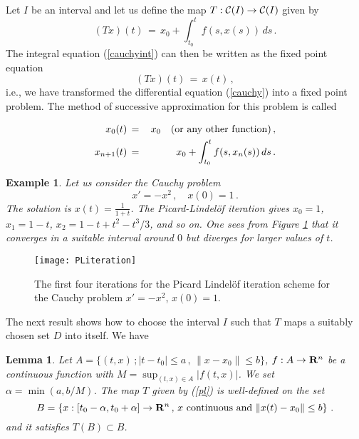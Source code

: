 \documentclass[12pt]{report}
\newcommand{\calC}{{\cal C}}
\newcommand{\bR}{{\bf R}}
\newtheorem{lemma}[theorem]{Lemma}
\newtheorem{example}[theorem]{Example}
\newcommand{\nn}{\nonumber}
\def\eqref#1{(\ref{#1})}
\def\to{\rightarrow}
\begin{document}
Let $I$ be an interval and let us define the map $T : \calC( I) \to \calC(I)$ given by  
\begin{equation}\label{pl}
(Tx)(t) \,=\, x_0 + \int_{t_0}^t f(s, x(s)) \, ds\,.
\end{equation} 
The integral equation \eqref{cauchyint} can then be written as the fixed point equation
\begin{equation} \label{pl2}
(Tx)(t)\,=\, x(t) \,,
\end{equation}
i.e., we have transformed the differential equation \eqref{cauchy}
into a fixed point problem.  The method of successive approximation
for this problem is called

\vspace{2mm}
\begin{eqnarray}\label{pili}
x_0(t)\,&=&\,  x_0 \quad ({\rm or~any~other~function}) \,, \nn \\
x_{n+1}(t)\,&=&\, x_0+ \int_{t_0}^t f(s, x_n(s)) \, ds  \,.
\end{eqnarray}

\begin{example}{\rm  
Let us consider the Cauchy problem 
\begin{equation} 
x' = - x^2 \,, \quad x(0) =1\,.
\end{equation}
The solution is $x(t)=\frac{1}{1+t}$.  The Picard-Lindel\"of iteration
gives $x_0 = 1$, $x_1 = 1 - t$, $x_2 = 1-t + t^2 - t^3/3$, and so
on. One sees from Figure \ref{pliteration} that it converges 
in a suitable interval around $0$ but diverges for larger values of $t$.
}
\end{example}

\begin{figure}[htbp]
\begin{center}
\texttt{[image: PLiteration]}
\caption{The first four iterations for the Picard Lindel\"of iteration
scheme for the Cauchy problem $x'=-x^2$, $x(0)=1$.}
\label{pliteration}
\end{center}
\end{figure}


The next result shows how to choose the interval $I$ such that $T$
maps a suitably chosen set $D$ into itself.  We have
\begin{lemma} Let $A= \{ (t,x) \,; |t-t_0| \le a \,,\, \|x-x_0\| \le b\}$, 
$f : A \to \bR^n$ be a continuous function with $M = \sup_{(t,x) \in A}
|f(t,x)|$.  We set $\alpha = \min(a, b/M)$. The map $T$ given by
\eqref{pl} is well-defined on the set
\begin{equation}
B = \left\{ x: [t_0 - \alpha, t_0 + \alpha] \to \bR^n\,,\, 
x {\rm~continuous~and~} \|x(t)-x_0\| \le b \right\}\,.
\end{equation}
and it satisfies $T(B) \subset B$.
\end{lemma}
\end{document}
